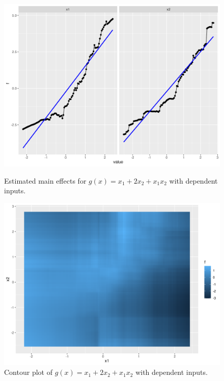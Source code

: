 \begin{figure}[htpb]
    \centering
    \begin{minipage}[t]{0.49\textwidth}
        \centering
        \includegraphics[width=\textwidth]{images/gg2_1.png}
        \caption{Estimated main effects for $g(x) = x_1 + 2 x_2 + x_1 x_2$ with dependent inputs.}
        \label{fig:main_effects_estimated}
    \end{minipage}%
    \hfill
    \begin{minipage}[t]{0.49\textwidth}
        \centering
        \includegraphics[width=\textwidth]{images/gg2_2.png}
        \caption{Contour plot of $g(x) = x_1 + 2 x_2 + x_1 x_2$ with dependent inputs.}
        \label{fig:contour_estimated}
    \end{minipage}
\end{figure}

